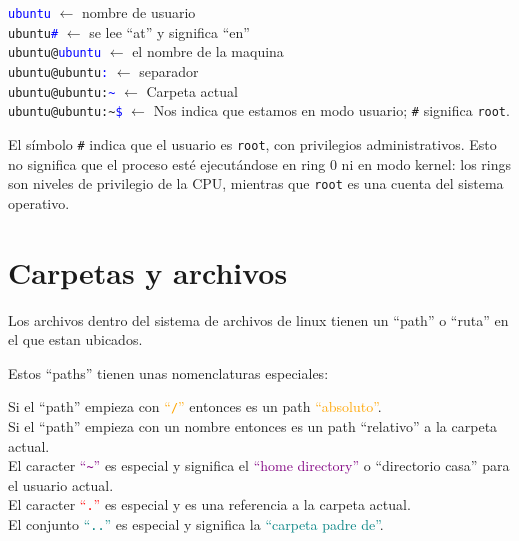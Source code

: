 \documentclass[11pt,a4paper]{article}
\begin{document}
\begin{notebox}
\textcolor{blue}{\texttt{ubuntu}} $\leftarrow$ nombre de usuario\\
\texttt{ubuntu}\textcolor{blue}{\texttt{\#}} $\leftarrow$ se lee ``at'' y significa ``en''\\
\texttt{ubuntu@}\textcolor{blue}{\texttt{ubuntu}} $\leftarrow$ el nombre de la maquina\\
\texttt{ubuntu@ubuntu}\textcolor{blue}{\texttt{:}} $\leftarrow$ separador\\
\texttt{ubuntu@ubuntu:}\textcolor{blue}{\texttt{\textasciitilde}} $\leftarrow$ Carpeta actual\\
\texttt{ubuntu@ubuntu:\textasciitilde}\textcolor{blue}{\texttt{\$}} $\leftarrow$ Nos indica que estamos en modo usuario; \texttt{\#} significa \texttt{root}.
\par\smallskip
El símbolo \texttt{\#} indica que el usuario es \texttt{root}, con privilegios administrativos. Esto no significa que el proceso esté ejecutándose en ring 0 ni en modo kernel: los rings son niveles de privilegio de la CPU, mientras que \texttt{root} es una cuenta del sistema operativo.
\end{notebox}

\section{Carpetas y archivos}

Los archivos dentro del sistema de archivos de linux tienen un ``path'' o ``ruta'' en el que estan ubicados.

Estos ``paths'' tienen unas nomenclaturas especiales:

\begin{notebox}
Si el ``path'' empieza con \textcolor{orange}{``\texttt{/}''} entonces es un path \textcolor{orange}{``absoluto''}.\\
Si el ``path'' empieza con un nombre entonces es un path \textcolor{green!45!black}{``relativo''} a la carpeta actual.\\
El caracter \textcolor{purple}{``\texttt{\textasciitilde}''} es especial y significa el \textcolor{purple}{``home directory''} o ``directorio casa'' para el usuario actual.\\
El caracter \textcolor{red}{``\texttt{.}''} es especial y es una referencia a la carpeta actual.\\
El conjunto \textcolor{teal}{``\texttt{..}''} es especial y significa la \textcolor{teal}{``carpeta padre de''}.
\end{notebox}
\end{document}
